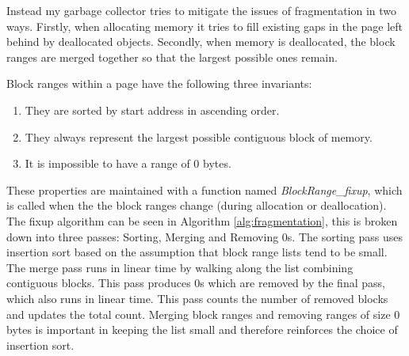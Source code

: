 \documentclass[../diss.tex]{subfiles}
\begin{document}
Instead my garbage collector tries to mitigate the issues of fragmentation in two ways. Firstly, when allocating memory it tries to fill existing gaps in the page left behind by deallocated objects. Secondly, when memory is deallocated, the block ranges are merged together so that the largest possible ones remain.

Block ranges within a page have the following three invariants:
\begin{enumerate}
    \item They are sorted by start address in ascending order.
    \item They always represent the largest possible contiguous block of memory.
    \item It is impossible to have a range of 0 bytes.
\end{enumerate}

These properties are maintained with a function named \emph{BlockRange\_fixup}, which is called when the the block ranges change (during allocation or deallocation). The fixup algorithm can be seen in Algorithm \ref{alg:fragmentation}, this is broken down into three passes: Sorting, Merging and Removing 0s. The sorting pass uses insertion sort based on the assumption that block range lists tend to be small. The merge pass runs in linear time by walking along the list combining contiguous blocks. This pass produces 0s which are removed by the final pass, which also runs in linear time. This pass counts the number of removed blocks and updates the total count. Merging block ranges and removing ranges of size 0 bytes is important in keeping the list small and therefore reinforces the choice of insertion sort.
\end{document}
